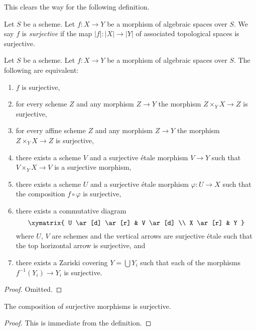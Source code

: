 \noindent
This clears the way for the following definition.

\begin{definition}
\label{definition-surjective}
Let $S$ be a scheme. Let $f : X \to Y$ be a morphism of algebraic
spaces over $S$. We say $f$ is {\it surjective}
if the map $|f| : |X| \to |Y|$ of associated topological spaces
is surjective.
\end{definition}

\begin{lemma}
\label{lemma-surjective-local}
Let $S$ be a scheme.
Let $f : X \to Y$ be a morphism of algebraic spaces over $S$.
The following are equivalent:
\begin{enumerate}
\item $f$ is surjective,
\item for every scheme $Z$ and any morphism $Z \to Y$ the morphism
$Z \times_Y X \to Z$ is surjective,
\item for every affine scheme $Z$ and any morphism
$Z \to Y$ the morphism $Z \times_Y X \to Z$ is surjective,
\item there exists a scheme $V$ and a surjective \'etale morphism
$V \to Y$ such that $V \times_Y X \to V$ is a surjective morphism,
\item there exists a scheme $U$ and a surjective \'etale morphism
$\varphi : U \to X$ such that the composition $f \circ \varphi$
is surjective,
\item there exists a commutative diagram
$$
\xymatrix{
U \ar[d] \ar[r] & V \ar[d] \\
X \ar[r] & Y
}
$$
where $U$, $V$ are schemes and the vertical arrows are surjective \'etale
such that the top horizontal arrow is surjective, and
\item there exists a Zariski covering $Y = \bigcup Y_i$ such that
each of the morphisms $f^{-1}(Y_i) \to Y_i$ is surjective.
\end{enumerate}
\end{lemma}

\begin{proof}
Omitted.
\end{proof}

\begin{lemma}
\label{lemma-composition-surjective}
The composition of surjective morphisms is surjective.
\end{lemma}

\begin{proof}
This is immediate from the definition.
\end{proof}

